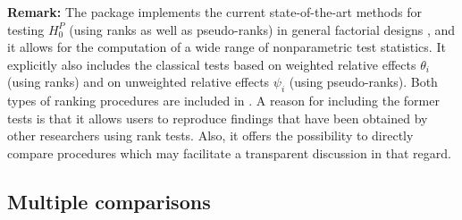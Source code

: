 \textbf{Remark:} The  package implements the current state-of-the-art methods for 
testing $H_0^P$ (using ranks as well as pseudo-ranks) in general factorial 
designs \citep{konietschke2012rank, brunner2017rank}, and it allows for the 
computation of a wide range of nonparametric test statistics. It explicitly 
also includes the classical tests based on weighted relative effects 
$\theta_i$ (using ranks) and on unweighted relative effects $\psi_i$ 
(using pseudo-ranks). Both types of ranking procedures are included in 
. A reason for including the former tests is that it allows users 
to reproduce findings that have been obtained by other researchers using rank 
tests. Also, it offers the possibility to directly compare procedures which may 
facilitate a transparent discussion in that regard. 

\subsection{Multiple comparisons}  \label{mcp}

